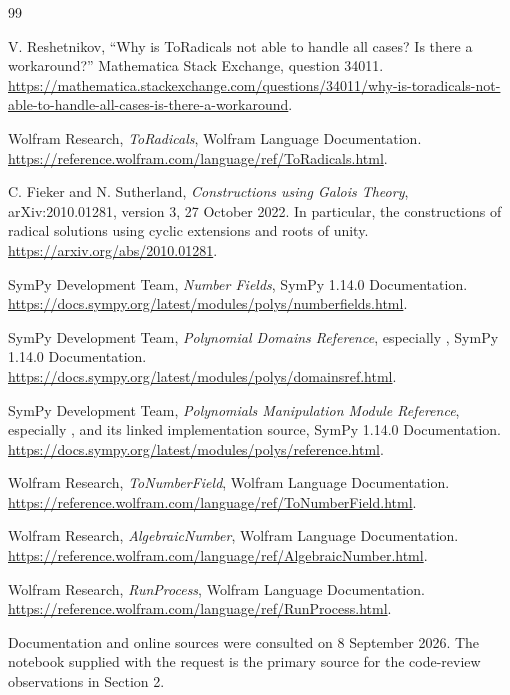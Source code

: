 \documentclass[11pt,a4paper]{article}
\newcommand{\code}[1]{\texttt{\detokenize{#1}}}
\theoremstyle{definition}
\theoremstyle{remark}
\begin{document}
\begingroup
\footnotesize\raggedright
\begin{thebibliography}{99}
\setlength{\itemsep}{3pt}
\setlength{\parskip}{0pt}

V. Reshetnikov, ``Why is ToRadicals not able to handle all cases? Is there a workaround?'' Mathematica Stack Exchange, question 34011.
\url{https://mathematica.stackexchange.com/questions/34011/why-is-toradicals-not-able-to-handle-all-cases-is-there-a-workaround}.

Wolfram Research, \emph{ToRadicals}, Wolfram Language Documentation.
\url{https://reference.wolfram.com/language/ref/ToRadicals.html}.

C. Fieker and N. Sutherland, \emph{Constructions using Galois Theory}, arXiv:2010.01281, version 3, 27 October 2022. In particular, the constructions of radical solutions using cyclic extensions and roots of unity.
\url{https://arxiv.org/abs/2010.01281}.

SymPy Development Team, \emph{Number Fields}, SymPy 1.14.0 Documentation.
\url{https://docs.sympy.org/latest/modules/polys/numberfields.html}.

SymPy Development Team, \emph{Polynomial Domains Reference}, especially \code{AlgebraicField}, SymPy 1.14.0 Documentation.
\url{https://docs.sympy.org/latest/modules/polys/domainsref.html}.

SymPy Development Team, \emph{Polynomials Manipulation Module Reference}, especially \code{Poly.same_root}, and its linked implementation source, SymPy 1.14.0 Documentation.
\url{https://docs.sympy.org/latest/modules/polys/reference.html}.

Wolfram Research, \emph{ToNumberField}, Wolfram Language Documentation.
\url{https://reference.wolfram.com/language/ref/ToNumberField.html}.

Wolfram Research, \emph{AlgebraicNumber}, Wolfram Language Documentation.
\url{https://reference.wolfram.com/language/ref/AlgebraicNumber.html}.

Wolfram Research, \emph{RunProcess}, Wolfram Language Documentation.
\url{https://reference.wolfram.com/language/ref/RunProcess.html}.

\end{thebibliography}
\endgroup
\small Documentation and online sources were consulted on 8 September 2026. The notebook supplied with the request is the primary source for the code-review observations in Section 2.
\end{document}
